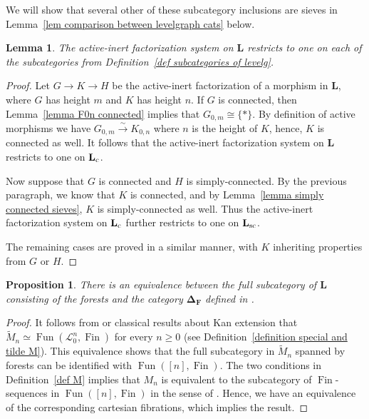\documentclass{amsart}
\numberwithin{theorem}{subsection}
\newtheorem{proposition}[theorem]{Proposition}
\newtheorem{lemma}[theorem]{Lemma}
\theoremstyle{definition}
\newcommand{\xFun}{\operatorname{Fun}}
\newcommand{\finset}{\operatorname{Fin}}
\newcommand{\finsetskel}{\mathbf{F}}
\newcommand{\isoto}{\xrightarrow{\sim}}
\newcommand{\name}[1]{\ensuremath{\text{\textup{#1}}}}
\newcommand{\simp}{\mathbf{\Delta}}
\newcommand{\levelg}{\mathbf{L}}
\newcommand{\levelgconn}{\levelg_{\name{c}}}
\newcommand{\scriptyell}{\mathscr L}
\begin{document}
We will show that several other of these subcategory inclusions are sieves in Lemma~\ref{lem comparison between levelgraph cats} below.

\begin{lemma}\label{lemma general level graph factorization systems}
The active-inert factorization system on $\levelg$ restricts to one on each of the subcategories from Definition~\ref{def subcategories of levelg}.
\end{lemma}
\begin{proof}
Let $G\to K\to H$ be the active-inert factorization of a morphism in $\levelg$, where $G$ has height $m$ and $K$ has height $n$. 
If $G$ is connected, then Lemma~\ref{lemma F0n connected} implies that $G_{0,m}\cong \{*\}$. 
By definition of active morphisms we have $G_{0,m}\isoto K_{0,n}$ where $n$ is the height of $K$, hence, $K$ is connected as well. 
It follows that the active-inert factorization system on $\levelg$ restricts to one on $\levelgconn$.

Now suppose that $G$ is connected and $H$ is simply-connected.
By the previous paragraph, we know that $K$ is connected,
and by Lemma~\ref{lemma simply connected sieves}, $K$ is simply-connected as well.
Thus the active-inert factorization system on $\levelgconn$ further restricts to one on $\levelg_{\name{sc}}$.

The remaining cases are proved in a similar manner, with $K$ inheriting properties from $G$ or $H$.
\end{proof}

\begin{proposition}\label{prop DF}
	There is an equivalence between the full subcategory of $\levelg$ consisting of the forests and the category $\simp_{\finsetskel}$ defined in \cite{bar}.
\end{proposition}
\begin{proof}
	It follows from \cite[Proposition 4.3.2.15]{ht} or classical results about Kan extension that $\widetilde{M}_n \simeq \xFun(\scriptyell^n_0,\finset)$ for every $n\geq 0$ (see Definition~\ref{definition special and tilde M}).
	This equivalence shows that the full subcategory in $\widetilde{M}_n$ spanned by forests can be identified with $\xFun([n],\finset)$. The two conditions in Definition~\ref{def M} implies that $M_n$ is equivalent to the subcategory of $\finset$-sequences in $\xFun([n],\finset)$ in the sense of \cite[Definition 2.4]{bar}. Hence, we have an equivalence of the corresponding cartesian fibrations, which implies the result.
\end{proof}
\end{document}
